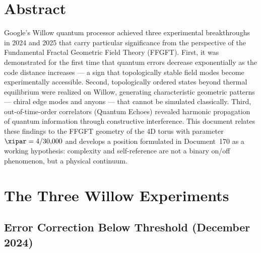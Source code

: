 
\section*{Abstract}

Google's Willow quantum processor achieved three experimental breakthroughs in 2024
and 2025 that carry particular significance from the perspective of the Fundamental
Fractal Geometric Field Theory (FFGFT). First, it was demonstrated for the first time
that quantum errors decrease exponentially as the code distance increases — a sign
that topologically stable field modes become experimentally accessible. Second,
topologically ordered states beyond thermal equilibrium were realized on Willow,
generating characteristic geometric patterns — chiral edge modes and anyons — that
cannot be simulated classically. Third, out-of-time-order correlators (Quantum Echoes)
revealed harmonic propagation of quantum information through constructive interference.
This document relates these findings to the FFGFT geometry of the 4D torus with
parameter $\xipar = 4/30{,}000$ and develops a position formulated in Document~170
as a working hypothesis: complexity and self-reference are not a binary on/off
phenomenon, but a physical continuum.

\clearpage

\section{The Three Willow Experiments}

\subsection{Error Correction Below Threshold (December 2024)}

